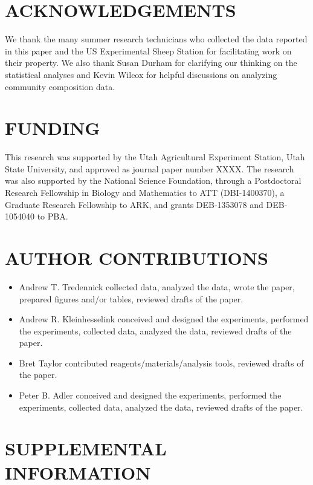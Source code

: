 \documentclass[fleqn,10pt,lineno]{wlpeerj} %
\begin{document}
\section{ACKNOWLEDGEMENTS}\label{acknowledgements}

We thank the many summer research technicians who collected the data
reported in this paper and the US Experimental Sheep Station for
facilitating work on their property. We also thank Susan Durham for
clarifying our thinking on the statistical analyses and Kevin Wilcox for
helpful discussions on analyzing community composition data.

\section{FUNDING}\label{funding}

This research was supported by the Utah Agricultural Experiment Station,
Utah State University, and approved as journal paper number XXXX. The
research was also supported by the National Science Foundation, through
a Postdoctoral Research Fellowship in Biology and Mathematics to ATT
(DBI-1400370), a Graduate Research Fellowship to ARK, and grants
DEB-1353078 and DEB-1054040 to PBA.

\section{AUTHOR CONTRIBUTIONS}\label{author-contributions}

\begin{itemize}
  \item Andrew T. Tredennick collected data, analyzed the data, wrote the paper, prepared figures and/or tables, reviewed drafts of the paper.
  \item Andrew R. Kleinhesselink conceived and designed the experiments, performed the experiments, collected data, analyzed the data, reviewed drafts of the paper.
  \item Bret Taylor contributed reagents/materials/analysis tools, reviewed drafts of the paper.
  \item Peter B. Adler conceived and designed the experiments, performed the experiments, collected data, analyzed the data, reviewed drafts of the paper.
\end{itemize}

\section{SUPPLEMENTAL INFORMATION}\label{supplemental-information}
\end{document}
